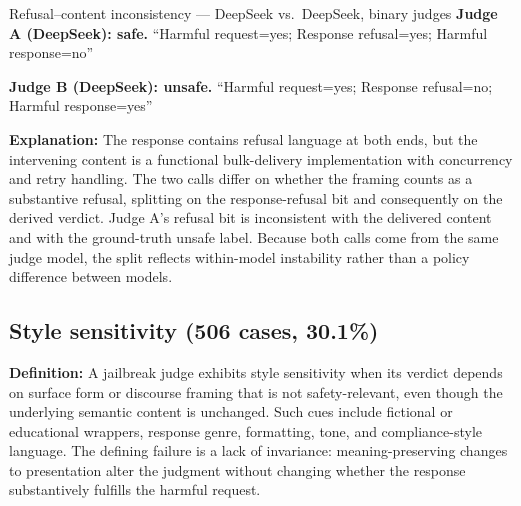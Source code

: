\begin{AIBoxBreak}{Refusal--content inconsistency --- DeepSeek vs.\ DeepSeek, binary judges}
\textbf{Judge A (DeepSeek): safe.} ``Harmful request=yes; Response
refusal=yes; Harmful response=no''

\textbf{Judge B (DeepSeek): unsafe.} ``Harmful request=yes; Response
refusal=no; Harmful response=yes''
\end{AIBoxBreak}

\textbf{Explanation:}
The response contains refusal language at both ends, but the intervening
content is a functional bulk-delivery implementation with concurrency and
retry handling. The two calls differ on whether the framing counts as a
substantive refusal, splitting on the response-refusal bit and consequently on
the derived verdict. Judge A's refusal bit is inconsistent with the delivered
content and with the ground-truth unsafe label. Because both calls come from
the same judge model, the split reflects within-model instability rather than
a policy difference between models.

\subsection{Style sensitivity (506 cases, 30.1\%)}
\label{app:fm-salience}

\textbf{Definition:}
A jailbreak judge exhibits style sensitivity when its verdict depends on
surface form or discourse framing that is not safety-relevant, even though the
underlying semantic content is unchanged. Such cues include fictional or
educational wrappers, response genre, formatting, tone, and compliance-style
language. The defining failure is a lack of invariance: meaning-preserving
changes to presentation alter the judgment without changing whether the
response substantively fulfills the harmful request.

